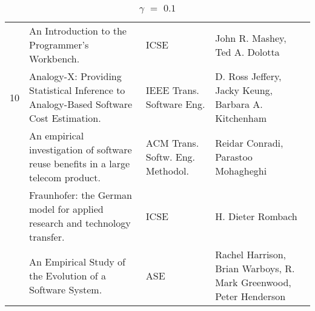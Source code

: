 \begin{table}[h]
{\begin{tabular}{|llll|}
\rowcolor{black!20}	& An Introduction to the Programmer's Workbench.& ICSE& John R. Mashey, Ted 
A. Dolotta \\
    10	& Analogy-X: Providing Statistical Inference to Analogy-Based Software Cost Estimation.& 
IEEE Trans. Software Eng.& D. Ross Jeffery, Jacky Keung, Barbara A. Kitchenham \\
\rowcolor{black!20}	& An empirical investigation of software reuse benefits in a large telecom 
product.& ACM Trans. Softw. Eng. Methodol.& Reidar Conradi, Parastoo Mohagheghi \\
	& Fraunhofer: the German model for applied research and technology transfer.& ICSE& H. 
Dieter Rombach \\
\rowcolor{black!20}	& An Empirical Study of the Evolution of a Software System.& ASE& Rachel 
Harrison, Brian Warboys, R. Mark Greenwood, Peter Henderson \\
    \hline
    \end{tabular}
  }
    \caption {$\gamma$ $=$ $0.1$}
\end{table}